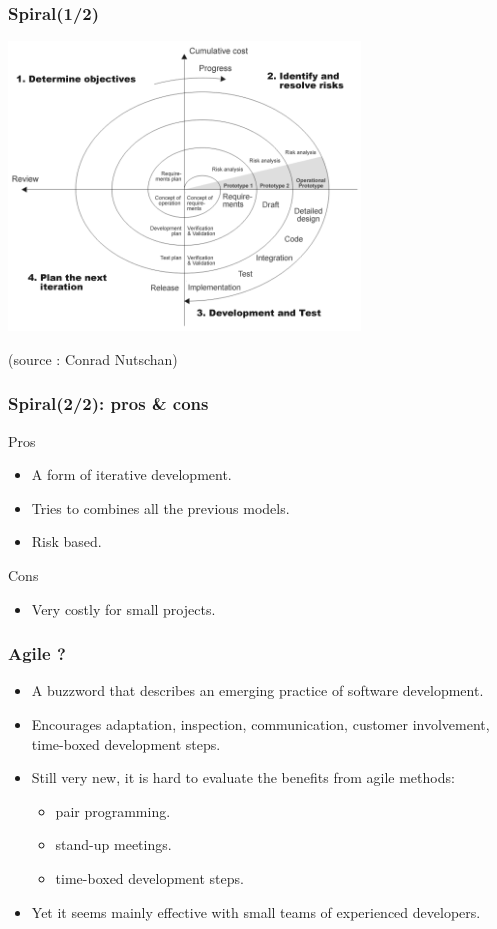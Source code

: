 \documentclass[10pt]{beamer}
\begin{document}
\begin{frame}[fragile]
  \frametitle{Spiral(1/2)}
  \begin{center}
    \includegraphics[width=0.7\textwidth]{spiral_model}
  \end{center}

  \tiny (source : Conrad Nutschan)
\end{frame}
\begin{frame}[fragile]
  \frametitle{Spiral(2/2): pros \& cons}
  \begin{exampleblock}{Pros}
    \begin{itemize}
    \item A form of iterative development.
    \item Tries to combines all the previous models.
    \item Risk based.
    \end{itemize}
  \end{exampleblock}
  \begin{alertblock}{Cons}
    \begin{itemize}
    \item Very costly for small projects.
    \end{itemize}
  \end{alertblock}
\end{frame}


\begin{frame}[fragile]
  \frametitle{Agile ?}
  \begin{itemize}
  \item A buzzword that describes an emerging practice of software development.
  \item Encourages adaptation, inspection, communication, customer involvement,
    time-boxed development steps.
  \item Still very new, it is hard to evaluate the benefits from agile methods:
    \begin{itemize}
    \item pair programming.
    \item stand-up meetings.
    \item time-boxed development steps.
    \end{itemize}
  \item Yet it seems mainly effective with small teams of experienced developers.
  \end{itemize}
\end{frame}
\end{document}
